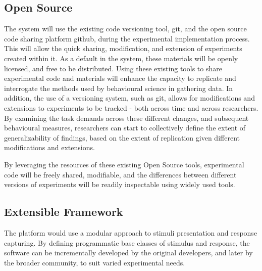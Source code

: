 \documentclass[12pt,a4paper,titlepage]{scrreprt}
\begin{document}
\subsection{Open Source}

The system will use the existing code versioning tool, git\cite{_git_????}, and the open source code sharing platform github\cite{_github_????}, during the experimental implementation process. This will allow the quick sharing, modification, and extension of experiments created within it. As a default in the system, these materials will be openly licensed, and free to be distributed. Using these existing tools to share experimental code and materials will enhance the capacity to replicate and interrogate the methods used by behavioural science in gathering data\cite{giner-sorolla_science_2012,nosek_scientific_2012,miguel_promoting_2014}. In addition, the use of a versioning system, such as git, allows for modifications and extensions to experiments to be tracked - both across time and across researchers. By examining the task demands across these different changes, and subsequent behavioural measures, researchers can start to collectively define the extent of generalizability of findings, based on the extent of replication given different modifications and extensions.

By leveraging the resources of these existing Open Source tools, experimental code will be freely shared, modifiable, and the differences between different versions of experiments will be readily inspectable using widely used tools.
\subsection{Extensible Framework}
The platform would use a modular approach to stimuli presentation and response capturing. By defining programmatic base classes of stimulus and response, the software can be incrementally developed by the original developers, and later by the broader community, to suit varied experimental needs. 
\end{document}
